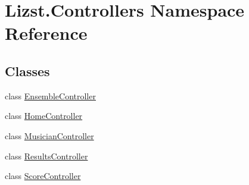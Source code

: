 \hypertarget{namespace_lizst_1_1_controllers}{}\section{Lizst.\+Controllers Namespace Reference}
\label{namespace_lizst_1_1_controllers}
\subsection*{Classes}
\begin{DoxyCompactItemize}
\item 
class \mbox{\hyperlink{class_lizst_1_1_controllers_1_1_ensemble_controller}{Ensemble\+Controller}}
\item 
class \mbox{\hyperlink{class_lizst_1_1_controllers_1_1_home_controller}{Home\+Controller}}
\item 
class \mbox{\hyperlink{class_lizst_1_1_controllers_1_1_musician_controller}{Musician\+Controller}}
\item 
class \mbox{\hyperlink{class_lizst_1_1_controllers_1_1_results_controller}{Results\+Controller}}
\item 
class \mbox{\hyperlink{class_lizst_1_1_controllers_1_1_score_controller}{Score\+Controller}}
\end{DoxyCompactItemize}

